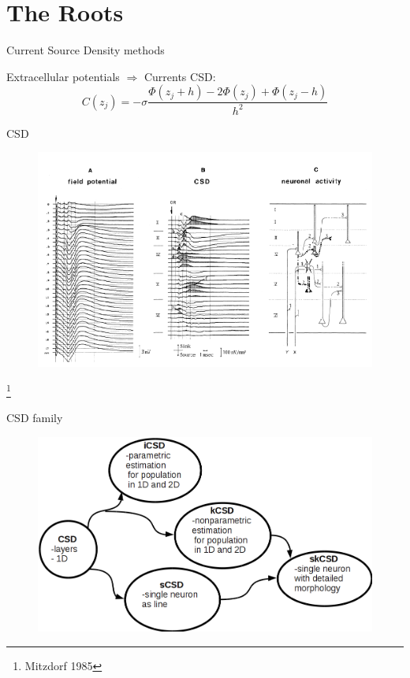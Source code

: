 \documentclass[11pt,a4paper,titlepage]{beamer}
\begin{document}



\section{The Roots}

\begin{frame}{Current Source Density methods}

Extracellular potentials $\Rightarrow$ Currents
CSD:
\begin{equation}
C(z_j)= - \sigma \frac{\Phi(z_j+h)-2\Phi(z_j)+\Phi(z_j-h)}{h^2}
\end{equation}


\end{frame}


\begin{frame}{CSD}
\begin{figure}
\includegraphics[height=6 cm]{plots/mitzdorf.png}

\end{figure}

\footnote{Mitzdorf 1985}
\end{frame} 
\begin{frame}{CSD family}
\begin{figure}
\includegraphics[height=6 cm]{plots/csd_family.png}

\end{figure}

\end{frame} 
\end{document}
